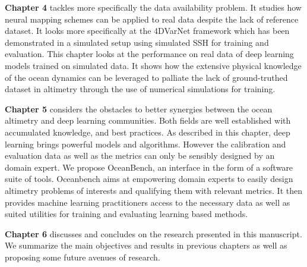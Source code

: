 \begin{bibunit}
\textbf{Chapter 4} tackles more specifically the data availability problem. It studies how neural mapping schemes can be applied to real data despite the lack of reference dataset.
It looks more specifically at the 4DVarNet framework which has been demonstrated in a simulated setup\cite{fabletENDTOENDPHYSICSINFORMEDREPRESENTATION2021} using simulated SSH for training and evaluation.
This chapter looks at the performance on real data of deep learning models trained on simulated data.
It shows how the extensive physical knowledge of the ocean dynamics can be leveraged to palliate the lack of ground-truthed dataset in altimetry through the use of numerical simulations for training.

\textbf{Chapter 5} considers the obstacles to better synergies between the ocean altimetry and deep learning communities.
Both fields are well established with accumulated knowledge, and best practices. 
As described in this chapter, deep learning brings powerful models and algorithms.
However the calibration and evaluation data as well as the metrics can only be sensibly designed by an domain expert. 
We propose OceanBench, an interface in the form of a software suite of tools.
Oceanbench aims at empowering domain experts to easily design altimetry problems of interests and qualifying them with relevant metrics. 
It then provides machine learning practitioners access to the necessary data as well as suited utilities for training and evaluating learning based methods.

\textbf{Chapter 6} discusses and concludes on the research presented in this manuscript. We summarize the main objectives and results in previous chapters as well as proposing some future avenues of research.


\end{bibunit}

